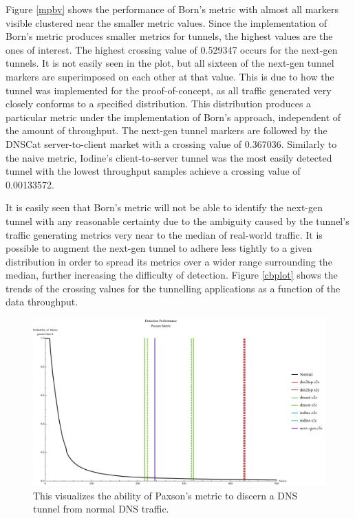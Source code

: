\documentclass[12pt]{report}
\theoremstyle{remark}
\theoremstyle{definition}
\theoremstyle{definition}
\theoremstyle{definition}
\begin{document}
Figure \ref{mpbv} shows the performance of Born's metric with almost all markers
visible clustered near the smaller metric values. Since the implementation of
Born's metric produces smaller metrics for tunnels, the highest values are the
ones of interest. The highest crossing value of 0.529347 occurs for the next-gen
tunnels. It is not easily seen in the plot, but all sixteen of the next-gen
tunnel markers are superimposed on each other at that value. This is due to how
the tunnel was implemented for the proof-of-concept, as all traffic generated
very closely conforms to a specified distribution. This distribution produces a
particular metric under the implementation of Born's approach, independent of
the amount of throughput. The next-gen tunnel markers are followed by the DNSCat
server-to-client market with a crossing value of 0.367036. Similarly to the
naive metric, Iodine's client-to-server tunnel was the most easily detected
tunnel with the lowest throughput samples achieve a crossing value of
0.00133572.

It is easily seen that Born's metric will not be able to identify the next-gen
tunnel with any reasonable certainty due to the ambiguity caused by the tunnel's
traffic generating metrics very near to the median of real-world traffic. It is
possible to augment the next-gen tunnel to adhere less tightly to a given
distribution in order to spread its metrics over a wider range surrounding the
median, further increasing the difficulty of detection. Figure \ref{cbplot}
shows the trends of the crossing values for the tunnelling applications as a
function of the data throughput.


\begin{figure}
\centering
\includegraphics[width=\textwidth]{figures/mppv-500.pdf}
\caption[Tunnel Detection Performance - Paxson's Metric]{This visualizes the
ability of Paxson's metric to discern a DNS tunnel from normal DNS traffic.}
\label{mppv}
\end{figure}
\end{document}
